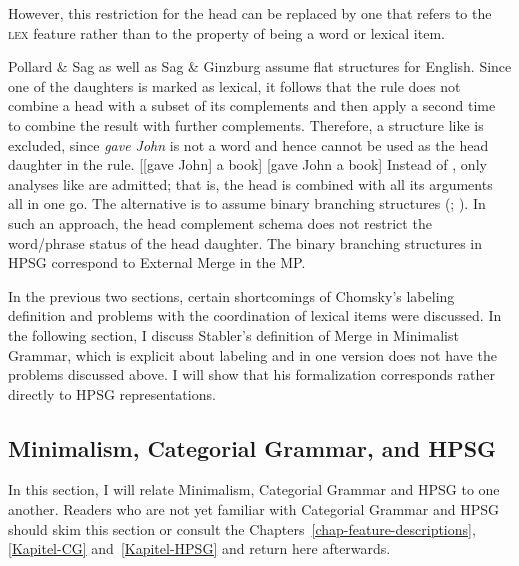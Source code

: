 However, this restriction for the head can be replaced by one that refers to the \textsc{lex} feature rather than
to the property of being a word or lexical item.

Pollard \& Sag as well as Sag \& Ginzburg assume flat structures for English. Since one of the daughters
is marked as lexical, it follows that the rule does not combine a head with a subset of its
complements and then apply a second time to combine the result with further complements. Therefore, a
structure like  is excluded, since \emph{gave John} is not a word and hence cannot be used
as the head daughter in the rule.
\eal
\ex\label{ex-gave-john-a-book-a} {}[[gave John] a book]
\ex\label{ex-gave-john-a-book-b} {}[gave John a book]
\zl
Instead of , only analyses like  are admitted; that is, the head is combined with
all its arguments all in one go. The alternative is to assume binary branching structures
(\citealp{MuellerHPSGHandbook}; \citealp[Section~1.2.2]{MOeDanish}). In such an approach, the head complement schema does
not restrict the word/phrase status of the head daughter. The binary branching structures in HPSG
correspond to External Merge in the MP.

In the previous two sections, certain shortcomings of Chomsky's labeling definition and problems
with the coordination of lexical items were discussed. In the following section, I discuss Stabler's definition of
Merge in Minimalist Grammar, which is explicit about labeling and in one version does not have the
problems discussed above. I will show that his formalization corresponds rather directly to HPSG
representations.

\subsection{Minimalism, Categorial Grammar, and HPSG}
\label{Abschnitt-MG}\label{sec-MG}

In this section, I will relate Minimalism, Categorial Grammar and HPSG to one another. Readers who are not yet familiar with
Categorial Grammar and HPSG should skim this section or consult the  
Chapters~\ref{chap-feature-descriptions}, \ref{Kapitel-CG} and~\ref{Kapitel-HPSG} and return here afterwards.

